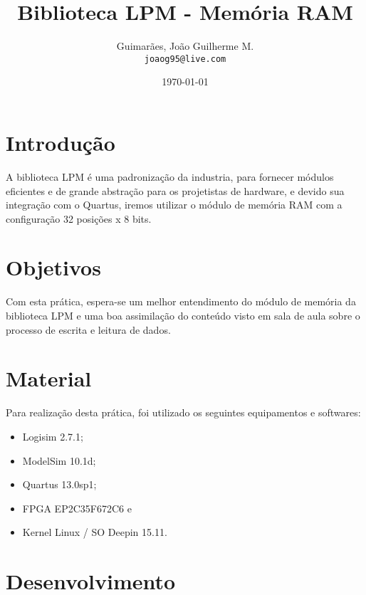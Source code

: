 \documentclass[12pt, a4paper]{article}
\title{\textbf{Biblioteca LPM - Memória RAM}}
\author{
	Guimarães, João Guilherme M.\\
	\texttt{joaog95@live.com}
}
\date{\today}
\begin{document}
	\maketitle
	
	\vspace{1cm}
	
	\section{Introdução}
	
	\par A biblioteca LPM é uma padronização da industria, para fornecer módulos eficientes e de grande abstração para os projetistas de hardware, e devido sua integração com o Quartus, iremos utilizar o módulo de memória RAM com a configuração 32 posições x 8 bits.
	
	\section{Objetivos}
	
	\par Com esta prática, espera-se um melhor entendimento do módulo de memória da biblioteca LPM e uma boa assimilação do conteúdo visto em sala de aula sobre o processo de escrita e leitura de dados.
	
	\section{Material}
	
	\par Para realização desta prática, foi utilizado os seguintes equipamentos e softwares:
	
	\begin{itemize}
		\item Logisim 2.7.1;
		\item ModelSim 10.1d;
		\item Quartus 13.0sp1;
		\item FPGA EP2C35F672C6 e
		\item Kernel Linux / SO Deepin 15.11.
	\end{itemize}
	
	\vspace{\baselineskip}	
	

    \section{Desenvolvimento}
    
\end{document}
